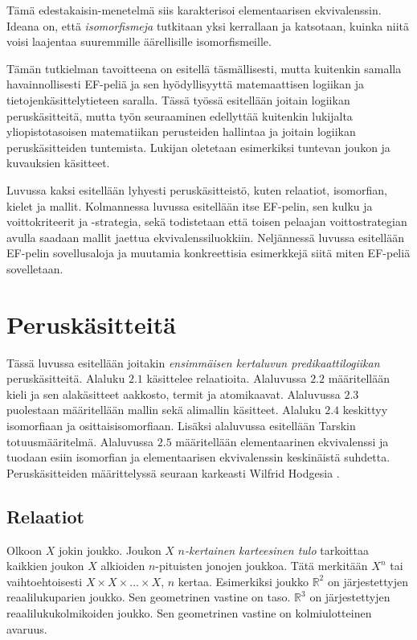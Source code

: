 \documentclass[finnish]{tktltiki2}
\theoremstyle{definition}
\theoremstyle{remark}
\begin{document}
Tämä edestakaisin-menetelmä siis karakterisoi elementaarisen ekvivalenssin. Ideana on, että \textit{isomorfismeja} tutkitaan yksi kerrallaan ja katsotaan, kuinka niitä voisi laajentaa suuremmille äärellisille isomorfismeille.

Tämän tutkielman tavoitteena on esitellä täsmällisesti, mutta kuitenkin samalla havainnollisesti EF-peliä ja sen hyödyllisyyttä matemaattisen logiikan ja tietojenkäsittelytieteen saralla. Tässä työssä esitellään joitain logiikan peruskäsitteitä, mutta työn seuraaminen edellyttää kuitenkin lukijalta yliopistotasoisen matematiikan perusteiden hallintaa ja joitain logiikan peruskäsitteiden tuntemista. Lukijan oletetaan esimerkiksi tuntevan joukon ja kuvauksien käsitteet.

Luvussa kaksi esitellään lyhyesti peruskäsitteistö, kuten relaatiot, isomorfian, kielet ja mallit. Kolmannessa luvussa esitellään itse EF-pelin, sen kulku ja voittokriteerit ja -strategia, sekä todistetaan että toisen pelaajan voittostrategian avulla saadaan mallit jaettua ekvivalenssiluokkiin. Neljännessä luvussa esitellään EF-pelin sovellusaloja ja muutamia konkreettisia esimerkkejä siitä miten EF-peliä sovelletaan.

\section{Peruskäsitteitä}
Tässä luvussa esitellään joitakin \textit{ensimmäisen kertaluvun predikaattilogiikan} peruskäsitteitä. Alaluku $2.1$ käsittelee relaatioita. Alaluvussa $2.2$ määritellään kieli ja sen alakäsitteet aakkosto, termit ja atomikaavat. Alaluvussa $2.3$ puolestaan määritellään mallin sekä alimallin käsitteet. Alaluku $2.4$ keskittyy isomorfiaan ja osittaisisomorfiaan. Lisäksi alaluvussa esitellään Tarskin totuusmääritelmä. Alaluvussa $2.5$ määritellään elementaarinen ekvivalenssi ja tuodaan esiin isomorfian ja elementaarisen ekvivalenssin keskinäistä suhdetta. Peruskäsitteiden määrittelyssä seuraan karkeasti Wilfrid Hodgesia \cite{Hod97}.

\subsection{Relaatiot}
Olkoon $X$ jokin joukko. Joukon $X$ $n$\textit{-kertainen karteesinen tulo} tarkoittaa kaikkien joukon $X$ alkioiden $n$-pituisten jonojen joukkoa. Tätä merkitään $X^n$ tai vaihtoehtoisesti $X \times X \times \ldots \times X$, $n$ kertaa. Esimerkiksi joukko $\mathbb{R}^2$ on järjestettyjen reaalilukuparien joukko. Sen geometrinen vastine on taso. $\mathbb{R}^3$ on järjestettyjen reaalilukukolmikoiden joukko. Sen geometrinen vastine on kolmiulotteinen avaruus. 
\end{document}
